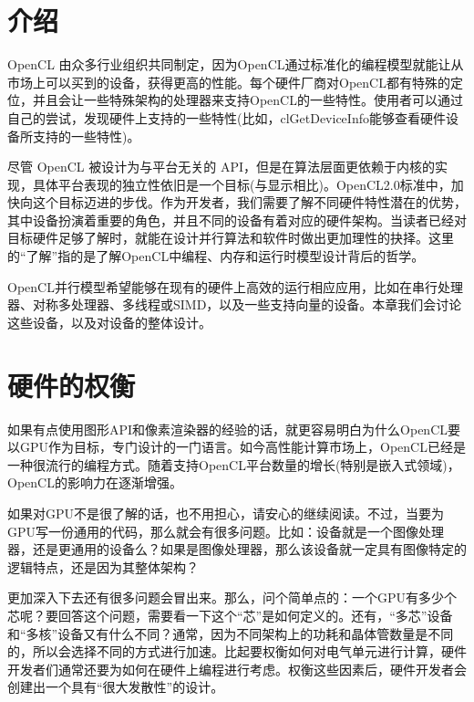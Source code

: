 

\section{介绍}

OpenCL 由众多行业组织共同制定，因为OpenCL通过标准化的编程模型就能让从市场上可以买到的设备，获得更高的性能。每个硬件厂商对OpenCL都有特殊的定位，并且会让一些特殊架构的处理器来支持OpenCL的一些特性。使用者可以通过自己的尝试，发现硬件上支持的一些特性(比如，clGetDeviceInfo能够查看硬件设备所支持的一些特性)。

尽管 OpenCL 被设计为与平台无关的 API，但是在算法层面更依赖于内核的实现，具体平台表现的独立性依旧是一个目标(与显示相比)。OpenCL2.0标准中，加快向这个目标迈进的步伐。作为开发者，我们需要了解不同硬件特性潜在的优势，其中设备扮演着重要的角色，并且不同的设备有着对应的硬件架构。当读者已经对目标硬件足够了解时，就能在设计并行算法和软件时做出更加理性的抉择。这里的“了解”指的是了解OpenCL中编程、内存和运行时模型设计背后的哲学。

OpenCL并行模型希望能够在现有的硬件上高效的运行相应应用，比如在串行处理器、对称多处理器、多线程或SIMD，以及一些支持向量的设备。本章我们会讨论这些设备，以及对设备的整体设计。



\section{硬件的权衡}

如果有点使用图形API和像素渲染器的经验的话，就更容易明白为什么OpenCL要以GPU作为目标，专门设计的一门语言。如今高性能计算市场上，OpenCL已经是一种很流行的编程方式。随着支持OpenCL平台数量的增长(特别是嵌入式领域)，OpenCL的影响力在逐渐增强。

如果对GPU不是很了解的话，也不用担心，请安心的继续阅读。不过，当要为GPU写一份通用的代码，那么就会有很多问题。比如：设备就是一个图像处理器，还是更通用的设备么？如果是图像处理器，那么该设备就一定具有图像特定的逻辑特点，还是因为其整体架构？

更加深入下去还有很多问题会冒出来。那么，问个简单点的：一个GPU有多少个芯呢？要回答这个问题，需要看一下这个“芯”是如何定义的。还有，“多芯”设备和“多核”设备又有什么不同？通常，因为不同架构上的功耗和晶体管数量是不同的，所以会选择不同的方式进行加速。比起要权衡如何对电气单元进行计算，硬件开发者们通常还要为如何在硬件上编程进行考虑。权衡这些因素后，硬件开发者会创建出一个具有“很大发散性”的设计。

